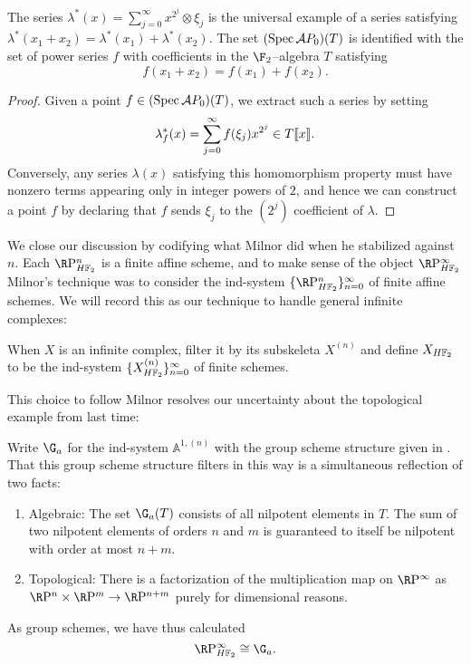 \begin{lemma}\label{SteenrodAlgIdentifiedWithAutGa}
The series $\lambda^*(x) = \sum_{j=0}^\infty x^{2^j} \otimes \xi_j$ is the universal example of a series satisfying $\lambda^*(x_1 + x_2) = \lambda^*(x_1) + \lambda^*(x_2)$.  The set $(\operatorname{Spec} \mathcal AP_0)(T)$ is identified with the set of power series $f$ with coefficients in the $\F_2$--algebra $T$ satisfying \[f(x_1 + x_2) = f(x_1) + f(x_2).\]
\end{lemma}
\begin{proof}
Given a point $f \in (\operatorname{Spec} \mathcal AP_0)(T)$, we extract such a series by setting \[\lambda^*_f(x) = \sum_{j=0}^\infty f(\xi_j) x^{2^j} \in T\llbracket{x}\rrbracket.\]  Conversely, any series $\lambda(x)$ satisfying this homomorphism property must have nonzero terms appearing only in integer powers of $2$, and hence we can construct a point $f$ by declaring that $f$ sends $\xi_j$ to the $(2^j)${\th} coefficient of $\lambda$.
\end{proof}

We close our discussion by codifying what Milnor did when he stabilized against $n$.  Each $\RP^n_{\HFtwo}$ is a finite affine scheme, and to make sense of the object $\RP^\infty_{\HFtwo}$ Milnor's technique was to consider the ind-system $\{\RP^n_{\HFtwo}\}_{n=0}^\infty$ of finite affine schemes.  We will record this as our technique to handle general infinite complexes:
\begin{definition}\label{FullDefnOfXHF2}
When $X$ is an infinite complex, filter it by its subskeleta $X^{(n)}$ and define $X_{\HFtwo}$ to be the ind-system $\{X^{(n)}_{\HFtwo}\}_{n=0}^\infty$ of finite schemes.
\end{definition}

This choice to follow Milnor resolves our uncertainty about the topological example from last time:
\begin{example}\label{RPinftyExampleForReal}
Write $\G_a$ for the ind-system $\mathbb A^{1, (n)}$ with the group scheme structure given in .  That this group scheme structure filters in this way is a simultaneous reflection of two facts:
\begin{enumerate}
\item Algebraic: The set $\G_a(T)$ consists of all nilpotent elements in $T$.  The sum of two nilpotent elements of orders $n$ and $m$ is guaranteed to itself be nilpotent with order at most $n+m$.
\item Topological: There is a factorization of the multiplication map on $\RP^\infty$ as $\RP^n \times \RP^m \to \RP^{n+m}$ purely for dimensional reasons.
\end{enumerate}
As group schemes, we have thus calculated \[\RP^\infty_{\HFtwo} \cong \G_a.\]
\end{example}

